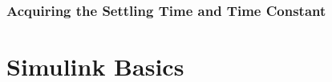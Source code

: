 \documentclass[letterpaper, 12pt, oneside]{memoir}
\begin{document}
\subsection{Acquiring the Settling Time and Time Constant}


\appendix

\chapter{Simulink Basics}\label{App:Simulink}


\backmatter
\end{document}
